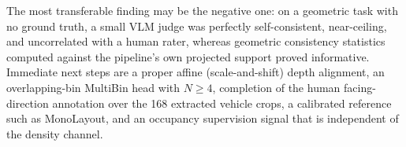\documentclass[sigconf]{acmart}
\newcommand{\rev}[1]{{\color{revcolor}#1}}
\begin{document}
The most transferable finding may be the negative one: on a geometric task with no ground truth, a small VLM judge was perfectly self-consistent, near-ceiling, and uncorrelated with a human rater, whereas geometric consistency statistics computed against the pipeline's own projected support proved informative. Immediate next steps are a proper affine (scale-and-shift) depth alignment, an overlapping-bin MultiBin head with $N \geq 4$, completion of the human facing-direction annotation over the 168 extracted vehicle crops, \rev{a calibrated reference such as MonoLayout,} and an occupancy supervision signal that is independent of the density channel.



\end{document}
